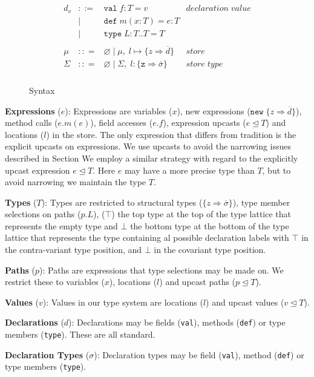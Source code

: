 \documentclass[a4paper,UKenglish]{lipics}
\begin{document}
\begin{figure}[h]
\[\begin{array}{lll}
\begin{array}{lllr}
&&\\
d_v & ::= & \texttt{val} \; f : T = v & declaration \; value \\
  & |   & \texttt{def} \; m(x:T) = e : T &\\
  & |   & \texttt{type} \; L : T .. T = T &\\
&&\\
\mu & :: = & \varnothing \; | \; \mu,\; l \mapsto \{z \Rightarrow \overline{d}\} & store \\
\Sigma & :: = & \varnothing \; | \; \Sigma,\; l : \{\texttt{z} \Rightarrow \overline{\sigma}\} & store \; type \\
\end{array}
\end{array}
\]
\caption{Syntax}
\label{f:syntax}
\end{figure}

\textbf{Expressions} ($e$): Expressions are variables ($x$), new expressions ($\texttt{new} \; \{z \Rightarrow \overline{d}\}$), method calls ($e.m(e)$), field accesses ($e.f$), expression upcasts ($e \unlhd T$) and locations ($l$) in the store. The only expression that differs from tradition is the explicit upcasts on expressions. We use upcasts to avoid the narrowing issues described in Section We employ a similar strategy with regard to the explicitly upcast expression $e \unlhd T$. Here $e$ may have a more precise type than $T$, but to avoid narrowing we maintain the type $T$.

\textbf{Types} ($T$): Types are restricted to structural types 
($\{z \Rightarrow \overline{\sigma}\}$), type member selections on 
paths ($p.L$), ($\top$) the top type at the top of the type lattice 
that represents the empty type and $\bot$ the bottom type at the 
bottom of the type lattice that represents the type containing 
al possible declaration labels with $\top$ in the contra-variant 
type position, and $\bot$ in the covariant type position.

\textbf{Paths} ($p$): Paths are expressions that type selections may be 
made on. We restrict these to variables ($x$), locations ($l$) and upcast paths ($p \unlhd T$).

\textbf{Values} ($v$): Values in our type system are locations ($l$) and upcast values ($v \unlhd T$). 

\textbf{Declarations} ($d$): Declarations may be fields (\texttt{val}), 
methods (\texttt{def}) or type members (\texttt{type}). These are all
standard.

\textbf{Declaration Types} ($\sigma$): Declaration types may be field 
(\texttt{val}), method (\texttt{def}) or type members (\texttt{type}). 
\end{document}
